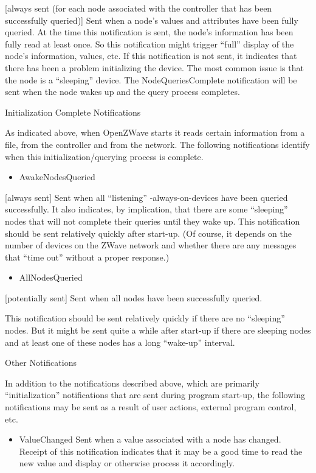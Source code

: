 \documentclass[letterpaper,10pt,english]{sphinxmanual}
\begin{document}
\begin{fulllineitems}
\begin{itemize}
\end{itemize}

{[}always sent (for each node associated with the controller that has been successfully queried){]}     Sent when a node’s values and attributes have been fully queried. At the time this notification is sent, the node’s information has been fully read at least once.  So this notification might trigger “full” display of the node’s information, values, etc. If this notification is not sent, it indicates that there has been a problem initializing the device.  The most common issue is that the node is a “sleeping” device.  The NodeQueriesComplete notification will be sent when the node wakes up and the query process completes.

Initialization Complete Notifications

As indicated above, when OpenZWave starts it reads certain information
from a file, from the controller and from the network.  The following
notifications identify when this initialization/querying process is complete.
\begin{itemize}
\item {} 
AwakeNodesQueried

\end{itemize}

{[}always sent{]}   Sent when all “listening” -always-on-devices have been
queried successfully.  It also indicates, by implication, that there
are some “sleeping” nodes that will not complete their queries until
they wake up. This notification should be sent relatively quickly
after start-up. (Of course, it depends on the number of devices on
the ZWave network and whether there are any messages that “time out”
without a proper response.)
\begin{itemize}
\item {} 
AllNodesQueried

\end{itemize}

{[}potentially sent{]}  Sent when all nodes have been successfully queried.

This notification should be sent relatively quickly if there are
no “sleeping” nodes. But it might be sent quite a while after start-up
if there are sleeping nodes and at least one of these nodes has a long “wake-up” interval.

Other Notifications

In addition to the notifications described above, which are primarily
“initialization” notifications that are sent during program start-up,
the following notifications may be sent as a result of user actions,
external program control, etc.
\begin{itemize}
\item {} 
ValueChanged  Sent when a value associated with a node has changed. Receipt of this notification indicates that it may be a good time to read the new value and display or otherwise process it accordingly.


\end{itemize}
\end{fulllineitems}
\end{document}
